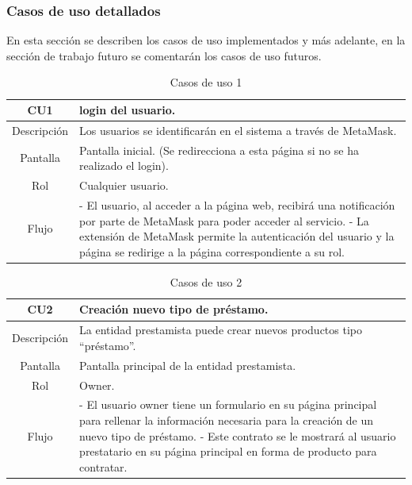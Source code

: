 \subsubsection{Casos de uso detallados}
En esta sección se describen los casos de uso implementados y más adelante,
en la sección de trabajo futuro se comentarán los casos de uso futuros.

\begin{table}[H]
\centering
\caption{Casos de uso 1}
\begin{tabular}{|c|p{12cm}|}
    \hline
    \rowcolor[HTML]{D0E7FF}
    CU1 & \gls{login} del usuario. \\ \hline
    Descripción   & Los usuarios se identificarán en el sistema a través de MetaMask.  \\ \hline
    Pantalla     & Pantalla inicial. (Se redirecciona a esta página si no se ha realizado el \gls{login}).   \\ \hline
    Rol     & Cualquier usuario. \\ \hline
    Flujo     &    - El usuario, al acceder a la página web, recibirá una notificación
    por parte de MetaMask  para poder acceder al
                           servicio. \newline
                   - La extensión de MetaMask permite la autenticación del          usuario y la página se redirige a la página correspondiente a su rol.
    \\ \hline
\end{tabular}
\end{table}

\begin{table}[H]
\centering
\caption{Casos de uso 2}
\begin{tabular}{|c|p{12cm}|}
    \hline
    \rowcolor[HTML]{D0E7FF}
    CU2 & Creación nuevo tipo de préstamo. \\ \hline
    Descripción   & La entidad prestamista puede crear nuevos productos tipo \enquote{préstamo}.  \\ \hline
    Pantalla     & Pantalla principal de la entidad prestamista.  \\ \hline
    Rol     & Owner. \\ \hline
    Flujo     &    - El usuario owner tiene un formulario en su página principal para
rellenar la información necesaria para la creación de un nuevo tipo de
préstamo.\newline
                   - Este contrato se le mostrará al usuario prestatario en su página principal en forma de producto para contratar.
                 \\ \hline
\end{tabular}
\end{table}

